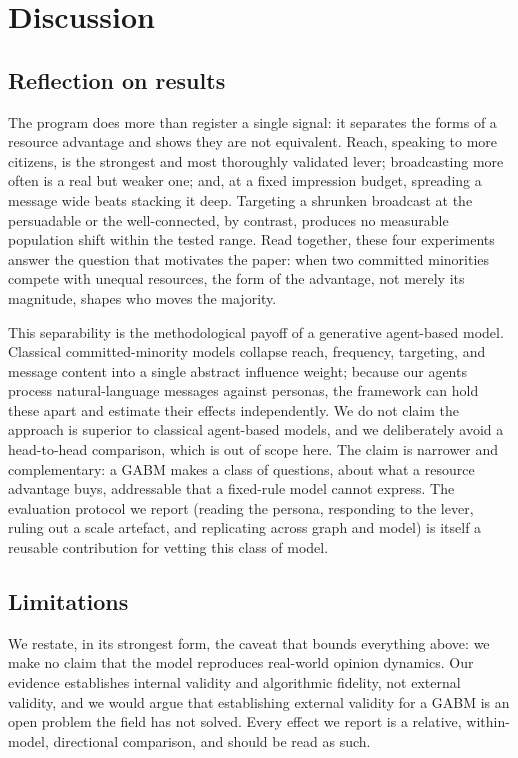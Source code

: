 \documentclass[pdflatex,sn-mathphys-num]{sn-jnl}%
\theoremstyle{thmstyleone}%
\theoremstyle{thmstyletwo}%
\theoremstyle{thmstylethree}%
\begin{document}
\section{Discussion} \label{sec:discuss}

\subsection{Reflection on results}

The program does more than register a single signal: it separates the forms of a
resource advantage and shows they are not equivalent. Reach, speaking to more citizens,
is the strongest and most thoroughly validated lever; broadcasting more often is a real
but weaker one; and, at a fixed impression budget, spreading a message wide beats
stacking it deep. Targeting a shrunken broadcast at the persuadable or the
well-connected, by contrast, produces no measurable population shift within the tested
range. Read together, these four experiments answer the question that motivates the
paper: when two committed minorities compete with unequal resources, the form of the
advantage, not merely its magnitude, shapes who moves the majority.

This separability is the methodological payoff of a generative agent-based model.
Classical committed-minority models collapse reach, frequency, targeting, and message
content into a single abstract influence weight; because our agents process
natural-language messages against personas, the framework can hold these apart and
estimate their effects independently. We do not claim the approach is superior to
classical agent-based models, and we deliberately avoid a head-to-head comparison, which
is out of scope here. The claim is narrower and complementary: a GABM makes a class of
questions, about what a resource advantage buys, addressable that a fixed-rule model
cannot express. The evaluation protocol we report (reading the persona, responding to
the lever, ruling out a scale artefact, and replicating across graph and model) is
itself a reusable contribution for vetting this class of model.

\subsection{Limitations}

We restate, in its strongest form, the caveat that bounds everything above: we make no
claim that the model reproduces real-world opinion dynamics. Our evidence establishes
internal validity and algorithmic fidelity, not external validity, and we would argue
that establishing external validity for a GABM is an open problem the field has not
solved. Every effect we report is a relative, within-model, directional comparison, and
should be read as such.
\end{document}
